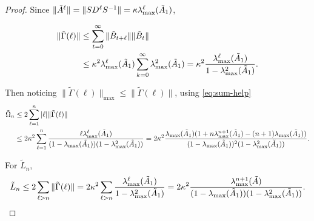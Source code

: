\begin{proof}
Since $\|\tilde{A}^\ell\| = \|SD^\ell S^{-1}\| =  \kappa\lambda_{\textup{max}}^\ell(\tilde{A}_1)$,


\begin{equation}
\begin{aligned}
\|\tilde{\Gamma}(\ell)\| &\le  \sum_{t=0}^\infty  \|\tilde{B}_{t+\ell}\|\|\tilde{B}_{t}\|   \\
&\le \kappa^2 \lambda^\ell_{\textup{max}}(\tilde{A}_1)\sum_{k=0}^{\infty} \lambda^2_{\textup{max}}(\tilde{A}_1)= \kappa^2 \frac{\lambda_{\textup{max}}^\ell(\tilde{A}_1)}{1-\lambda^2_{\text{max}}(\tilde{A}_1)}.\nonumber
\end{aligned}
\end{equation}


Then noticing $\|\tilde{\Gamma}(\ell)\|_{\text{max}}\le \|\tilde{\Gamma}(\ell)\|$, using \eqref{eq:sum-help}
\begin{equation}
\begin{aligned}
\tilde{\Omega}_n &\le 2\sum_{\ell=1}^n |\ell|\|\tilde{\Gamma}(\ell)\| \\
&\le 2\kappa^2 \sum_{\ell=1}^n  \frac{\ell\lambda_{\textup{max}}^\ell(\tilde{A}_1)}{(1-\lambda_{\textup{max}}(\tilde{A}_1))(1-\lambda^2_{\textup{max}}(\tilde{A}_1))} = 2\kappa^2\frac{\lambda_{\textup{max}}(\tilde{A}_1)(1+n\lambda_{\textup{max}}^{n+1}(\tilde{A}_1)-(n+1)\lambda_{\textup{max}}(\tilde{A}_1))}{(1-\lambda_{\textup{max}}(\tilde{A}_1))^2(1-\lambda^2_{\textup{max}}(\tilde{A}_1))}. \nonumber
\end{aligned}
\end{equation}

For $\tilde{L}_n$, 
\begin{equation}
\tilde{L}_n \le 2\sum_{\ell> n} \|\tilde{\Gamma}(\ell)\| = 2\kappa^2\sum_{\ell > n}\frac{\lambda_{\textup{max}}^\ell(\tilde{A}_1)}{1-\lambda^2_{\textup{max}}(\tilde{A}_1)} = 2\kappa^2\frac{\lambda_{\textup{max}}^{n+1}(\tilde{A})}{(1-\lambda_{\textup{max}}(\tilde{A}_1))(1-\lambda^2_{\textup{max}}(\tilde{A}_1))}.\nonumber
\end{equation}
\end{proof}


